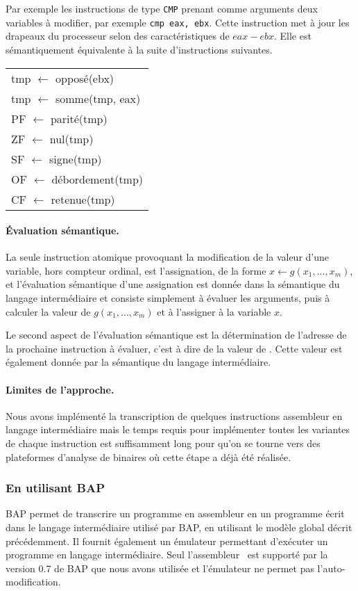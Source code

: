 Par exemple les instructions de type \texttt{CMP} prenant comme arguments deux variables à modifier, par exemple \texttt{cmp eax, ebx}.
Cette instruction met à jour les drapeaux du processeur selon des caractéristiques de $eax-ebx$.
Elle est sémantiquement équivalente à la suite d'instructions suivantes.
\begin{center}
\begin{tabular}[b]{l}
tmp $\leftarrow$ opposé(ebx)\\
tmp $\leftarrow$ somme(tmp, eax)\\
PF $\leftarrow$ parité(tmp) \\
ZF $\leftarrow$ nul(tmp) \\
SF $\leftarrow$ signe(tmp) \\
OF $\leftarrow$ débordement(tmp) \\
CF $\leftarrow$ retenue(tmp)
\end{tabular}
\end{center}

\paragraph{Évaluation sémantique.}
La seule instruction atomique provoquant la modification de la valeur d'une variable, hors compteur ordinal, est l'assignation, de la forme $x\leftarrow g(x_1, ..., x_m)$, et l'évaluation sémantique d'une assignation est donnée dans la sémantique du langage intermédiaire et consiste simplement à évaluer les arguments, puis à calculer la valeur de $g(x_1, ..., x_m)$ et à l'assigner à la variable $x$.

Le second aspect de l'évaluation sémantique est la détermination de l'adresse de la prochaine instruction à évaluer, c'est à dire de la valeur de \eip. Cette valeur est également donnée par la sémantique du langage intermédiaire.

\paragraph{Limites de l'approche.}
Nous avons implémenté la transcription de quelques instructions assembleur en langage intermédiaire mais le temps requis pour implémenter toutes les variantes de chaque instruction est suffisamment long pour qu'on se tourne vers des plateformes d'analyse de binaires où cette étape a déjà été réalisée.


\subsubsection{En utilisant BAP}
BAP permet de transcrire un programme en assembleur en un programme écrit dans le langage intermédiaire utilisé par BAP, en utilisant le modèle global décrit précédemment.
Il fournit également un émulateur permettant d'exécuter un programme en langage intermédiaire.
Seul l'assembleur \xq\ est supporté par la version 0.7 de BAP que nous avons utilisée et l'émulateur ne permet pas l'auto-modification.


